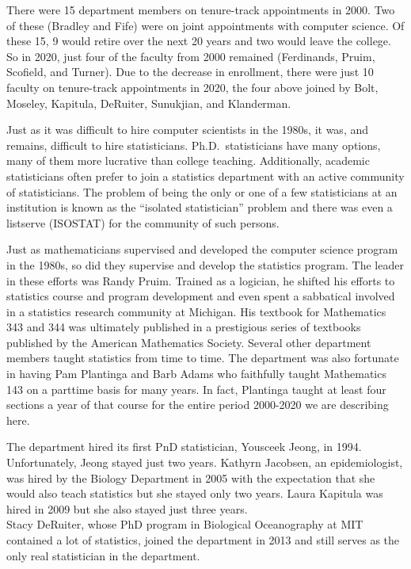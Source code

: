 \documentclass[
]{book}
\begin{document}
There were 15 department members on tenure-track appointments in 2000. Two of these (Bradley and Fife) were on joint appointments with computer science. Of these 15, 9 would retire over the next 20 years and two would leave the college. So in 2020, just four of the faculty from 2000 remained (Ferdinands, Pruim, Scofield, and Turner). Due to the decrease in enrollment, there were just 10 faculty on tenure-track appointments in 2020, the four above joined by Bolt, Moseley, Kapitula, DeRuiter, Sunukjian, and Klanderman.

Just as it was difficult to hire computer scientists in the 1980s, it was, and remains, difficult to hire statisticians. Ph.D.~statisticians have many options, many of them more lucrative than college teaching. Additionally, academic statisticians often prefer to join a statistics department with an active community of statisticians. The problem of being the only or one of a few statisticians at an institution is known as the ``isolated statistician'' problem and there was even a listserve (ISOSTAT) for the community of such persons.

Just as mathematicians supervised and developed the computer science program in the 1980s, so did they supervise and develop the statistics program. The leader in these efforts was Randy Pruim. Trained as a logician, he shifted his efforts to statistics course and program development and even spent a sabbatical involved in a statistics research community at Michigan. His textbook for Mathematics 343 and 344 was ultimately published in a prestigious series of textbooks published by the American Mathematics Society. Several other department members taught statistics from time to time. The department was also fortunate in having Pam Plantinga and Barb Adams who faithfully taught Mathematics 143 on a parttime basis for many years. In fact, Plantinga taught at least four sections a year of that course for the entire period 2000-2020 we are describing here.

The department hired its first PnD statistician, Yousceek Jeong, in 1994. Unfortunately, Jeong stayed just two years. Kathyrn Jacobsen, an epidemiologist, was hired by the Biology Department in 2005 with the expectation that she would also teach statistics but she stayed only two years. Laura Kapitula was hired in 2009 but she also stayed just three years.\\
Stacy DeRuiter, whose PhD program in Biological Oceanography at MIT contained a lot of statistics, joined the department in 2013 and still serves as the only real statistician in the department.
\end{document}
